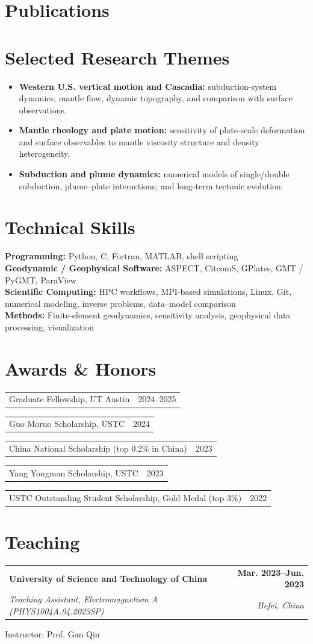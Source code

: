 \documentclass[10pt,letterpaper]{article}
\makeatletter
\newcommand{\cventry}[4]{%
  \begin{tabularx}{\textwidth}{@{}Xr@{}}
    \textbf{#1} & \textbf{#2} \\
    \textit{#3} & \textit{#4}
  \end{tabularx}\vspace{0.15em}
}
\newcommand{\cvsubentry}[2]{%
  \begin{tabularx}{\textwidth}{@{}Xr@{}}
    #1 & #2
  \end{tabularx}
}
\newcommand{\cvskill}[2]{\textbf{#1:} #2\\}
\makeatother
\begin{document}
\section{Publications}
\nocite{*}
\printbibliography[heading=none]

\section{Selected Research Themes}
\begin{itemize}
  \item \textbf{Western U.S. vertical motion and Cascadia:} subduction-system dynamics, mantle flow, dynamic topography, and comparison with surface observations.
  \item \textbf{Mantle rheology and plate motion:} sensitivity of plate-scale deformation and surface observables to mantle viscosity structure and density heterogeneity.
  \item \textbf{Subduction and plume dynamics:} numerical models of single/double subduction, plume--plate interactions, and long-term tectonic evolution.
\end{itemize}

\section{Technical Skills}
\cvskill{Programming}{Python, C, Fortran, MATLAB, shell scripting}
\cvskill{Geodynamic / Geophysical Software}{ASPECT, CitcomS, GPlates, GMT / PyGMT, ParaView}
\cvskill{Scientific Computing}{HPC workflows, MPI-based simulations, Linux, Git, numerical modeling, inverse problems, data--model comparison}
\cvskill{Methods}{Finite-element geodynamics, sensitivity analysis, geophysical data processing, visualization}

\section{Awards \& Honors}
\cvsubentry{Graduate Fellowship, UT Austin}{2024--2025}
\cvsubentry{Guo Moruo Scholarship, USTC}{2024}
\cvsubentry{China National Scholarship (top 0.2\% in China)}{2023}
\cvsubentry{Yang Yongman Scholarship, USTC}{2023}
\cvsubentry{USTC Outstanding Student Scholarship, Gold Medal (top 3\%)}{2022}

\section{Teaching}
\cventry{University of Science and Technology of China}{Mar. 2023--Jun. 2023}
{Teaching Assistant, Electromagnetism A (PHYS1004A.04.2023SP)}{Hefei, China}
Instructor: Prof. Gan Qin
\end{document}
